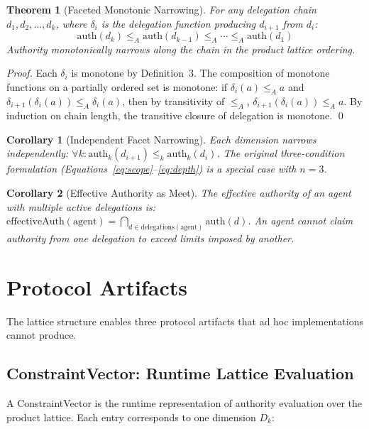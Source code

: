 \documentclass[sigconf,nonacm]{acmart}
\newtheorem{theorem}{Theorem}
\newtheorem{corollary}{Corollary}
\begin{document}
\begin{theorem}[Faceted Monotonic Narrowing]
For any delegation chain $d_1, d_2, \ldots, d_k$, where $\delta_i$ is the delegation
function producing $d_{i+1}$ from $d_i$:
\[
\text{auth}(d_k) \leq_A \text{auth}(d_{k-1}) \leq_A \cdots \leq_A \text{auth}(d_1)
\]
Authority monotonically narrows along the chain in the product lattice ordering.
\end{theorem}

\begin{proof}
Each $\delta_i$ is monotone by Definition~3. The composition of monotone functions
on a partially ordered set is monotone: if $\delta_i(a) \leq_A a$ and
$\delta_{i+1}(\delta_i(a)) \leq_A \delta_i(a)$, then by transitivity of $\leq_A$,
$\delta_{i+1}(\delta_i(a)) \leq_A a$. By induction on chain length, the transitive
closure of delegation is monotone. \qed
\end{proof}

\begin{corollary}[Independent Facet Narrowing]
Each dimension narrows independently:
$\forall k: \text{auth}_k(d_{i+1}) \leq_k \text{auth}_k(d_i)$.
The original three-condition formulation (Equations~\ref{eq:scope}--\ref{eq:depth})
is a special case with $n=3$.
\end{corollary}

\begin{corollary}[Effective Authority as Meet]
The effective authority of an agent with multiple active delegations is:
$\text{effectiveAuth}(\text{agent}) = \bigcap_{d \in \text{delegations}(\text{agent})} \text{auth}(d)$.
An agent cannot claim authority from one delegation to exceed limits imposed by another.
\end{corollary}

\section{Protocol Artifacts}

The lattice structure enables three protocol artifacts that ad hoc implementations
cannot produce.

\subsection{ConstraintVector: Runtime Lattice Evaluation}

A ConstraintVector is the runtime representation of authority evaluation over the product
lattice. Each entry corresponds to one dimension $D_k$:
\end{document}
